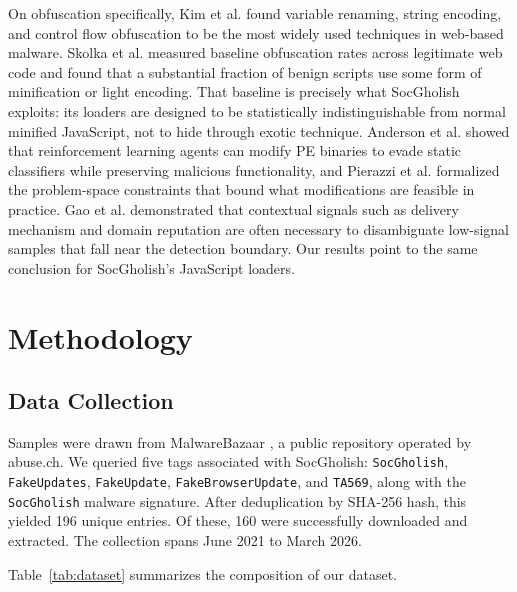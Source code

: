 \documentclass[pdflatex,sn-mathphys-num]{sn-jnl}
\theoremstyle{thmstyleone}%
\theoremstyle{thmstyletwo}%
\theoremstyle{thmstylethree}%
\begin{document}
On obfuscation specifically, Kim et al. \cite{kim2022} found variable renaming, string encoding, and control flow obfuscation to be the most widely used techniques in web-based malware. Skolka et al. \cite{skolka2019} measured baseline obfuscation rates across legitimate web code and found that a substantial fraction of benign scripts use some form of minification or light encoding. That baseline is precisely what SocGholish exploits: its loaders are designed to be statistically indistinguishable from normal minified JavaScript, not to hide through exotic technique. Anderson et al. \cite{anderson2018} showed that reinforcement learning agents can modify PE binaries to evade static classifiers while preserving malicious functionality, and Pierazzi et al. \cite{pierazzi2020} formalized the problem-space constraints that bound what modifications are feasible in practice. Gao et al. \cite{gao2018} demonstrated that contextual signals such as delivery mechanism and domain reputation are often necessary to disambiguate low-signal samples that fall near the detection boundary. Our results point to the same conclusion for SocGholish's JavaScript loaders.


\section{Methodology}\label{sec:methodology}

\subsection{Data Collection}\label{subsec:data_collection}

Samples were drawn from MalwareBazaar \cite{malwarebazaar}, a public repository operated by abuse.ch. We queried five tags associated with SocGholish: \texttt{SocGholish}, \texttt{FakeUpdates}, \texttt{FakeUpdate}, \texttt{FakeBrowserUpdate}, and \texttt{TA569}, along with the \texttt{SocGholish} malware signature. After deduplication by SHA-256 hash, this yielded 196 unique entries. Of these, 160 were successfully downloaded and extracted. The collection spans June 2021 to March 2026.

Table~\ref{tab:dataset} summarizes the composition of our dataset.
\end{document}

